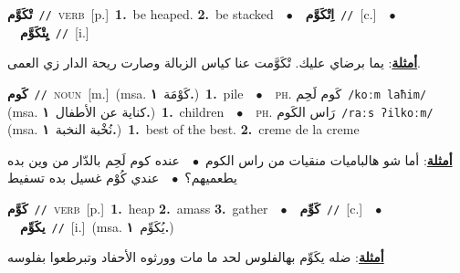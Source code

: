 \documentclass[10pt,a4paper,twoside]{article} %
\begin{document}
\begin{multicols}{2}
{\setlength\topsep{0pt}\textbf{\foreignlanguage{arabic}{تْكَوَّم}}\ {\color{gray}\texttt{//}\color{black}}\ \textsc{verb}\ [p.]\ \textbf{1.}~be heaped.  \textbf{2.}~be stacked\ \ $\bullet$\ \ \setlength\topsep{0pt}\textbf{\foreignlanguage{arabic}{اِتْكَوَّم}}\ {\color{gray}\texttt{//}\color{black}}\ [c.]\ \ $\bullet$\ \ \setlength\topsep{0pt}\textbf{\foreignlanguage{arabic}{يِتْكَوَّم}}\ {\color{gray}\texttt{//}\color{black}}\ [i.]\  \begin{flushright}\color{gray}\foreignlanguage{arabic}{\textbf{\underline{\foreignlanguage{arabic}{أمثلة}}}: يما برضاي عليك. تْكَوَّمت عنا كياس الزبالة وصارت ريحة الدار زي العمى.}\end{flushright}\color{black}} \vspace{2mm}

{\setlength\topsep{0pt}\textbf{\foreignlanguage{arabic}{كَوم}}\ {\color{gray}\texttt{//}\color{black}}\ \textsc{noun}\ [m.]\ \color{gray}(msa. \foreignlanguage{arabic}{كَوْمَة}~\foreignlanguage{arabic}{\textbf{١.}})\color{black}\ \textbf{1.}~pile\ \ $\bullet$\ \ \textsc{ph.} \color{gray} \foreignlanguage{arabic}{كَوم لَحِم}\color{black}\ {\color{gray}\texttt{/{\sffamily koːm laħim}/}\color{black}}\ \color{gray} (msa. \foreignlanguage{arabic}{كناية عن الأطفال}~\foreignlanguage{arabic}{\textbf{١.}})\color{black}\ \textbf{1.}~children\ \ $\bullet$\ \ \textsc{ph.} \color{gray} \foreignlanguage{arabic}{رَاس الكَوم}\color{black}\ {\color{gray}\texttt{/{\sffamily raːs ʔilkoːm}/}\color{black}}\ \color{gray} (msa. \foreignlanguage{arabic}{نُخْبة النخبة}~\foreignlanguage{arabic}{\textbf{١.}})\color{black}\ \textbf{1.}~best of the best.  \textbf{2.}~creme de la creme\  \begin{flushright}\color{gray}\foreignlanguage{arabic}{\textbf{\underline{\foreignlanguage{arabic}{أمثلة}}}: أما شو هالباميات منقيات من راس الكوم\ $\bullet$\ \  عنده كوم لَحِم بالدّار من وين بده يطعميهم؟\ $\bullet$\ \  عندي كُوْم غسيل بده تسفيط}\end{flushright}\color{black}} \vspace{2mm}

{\setlength\topsep{0pt}\textbf{\foreignlanguage{arabic}{كَوَّم}}\ {\color{gray}\texttt{//}\color{black}}\ \textsc{verb}\ [p.]\ \textbf{1.}~heap  \textbf{2.}~amass  \textbf{3.}~gather\ \ $\bullet$\ \ \setlength\topsep{0pt}\textbf{\foreignlanguage{arabic}{كَوِّم}}\ {\color{gray}\texttt{//}\color{black}}\ [c.]\ \ $\bullet$\ \ \setlength\topsep{0pt}\textbf{\foreignlanguage{arabic}{يكَوِّم}}\ {\color{gray}\texttt{//}\color{black}}\ [i.]\ \color{gray}(msa. \foreignlanguage{arabic}{يُكَوِّم}~\foreignlanguage{arabic}{\textbf{١.}})\color{black}\  \begin{flushright}\color{gray}\foreignlanguage{arabic}{\textbf{\underline{\foreignlanguage{arabic}{أمثلة}}}: ضله يكَوِّم بهالفلوس لحد ما مات وورثوه الأحفاد وتبرطعوا بفلوسه}\end{flushright}\color{black}} \vspace{2mm}


\end{multicols}
\end{document}

